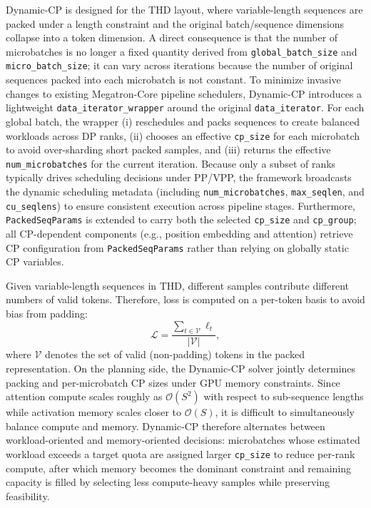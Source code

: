 \documentclass[10pt,logo,copyright]{nvidiatechreport}
\begin{document}
Dynamic-CP is designed for the THD layout, where variable-length sequences are packed under a length constraint and the original batch/sequence dimensions collapse into a token dimension. A direct consequence is that the number of microbatches is no longer a fixed quantity derived from \texttt{global\_batch\_size} and \texttt{micro\_batch\_size}; it can vary across iterations because the number of original sequences packed into each microbatch is not constant. To minimize invasive changes to existing Megatron-Core pipeline schedulers, Dynamic-CP introduces a lightweight \texttt{data\_iterator\_wrapper} around the original \texttt{data\_iterator}. For each global batch, the wrapper (i) reschedules and packs sequences to create balanced workloads across DP ranks, (ii) chooses an effective \texttt{cp\_size} for each microbatch to avoid over-sharding short packed samples, and (iii) returns the effective \texttt{num\_microbatches} for the current iteration. Because only a subset of ranks typically drives scheduling decisions under PP/VPP, the framework broadcasts the dynamic scheduling metadata (including \texttt{num\_microbatches}, \texttt{max\_seqlen}, and \texttt{cu\_seqlens}) to ensure consistent execution across pipeline stages. Furthermore, \texttt{PackedSeqParams} is extended to carry both the selected \texttt{cp\_size} and \texttt{cp\_group}; all CP-dependent components (e.g., position embedding and attention) retrieve CP configuration from \texttt{PackedSeqParams} rather than relying on globally static CP variables.

Given variable-length sequences in THD, different samples contribute different numbers of valid tokens. Therefore, loss is computed on a per-token basis to avoid bias from padding:
\begin{equation}
\mathcal{L} = \frac{\sum_{t\in \mathcal{V}} \ell_t}{|\mathcal{V}|},
\end{equation}
where $\mathcal{V}$ denotes the set of valid (non-padding) tokens in the packed representation. On the planning side, the Dynamic-CP solver jointly determines packing and per-microbatch CP sizes under GPU memory constraints. Since attention compute scales roughly as $\mathcal{O}(S^2)$ with respect to sub-sequence lengths while activation memory scales closer to $\mathcal{O}(S)$, it is difficult to simultaneously balance compute and memory. Dynamic-CP therefore alternates between workload-oriented and memory-oriented decisions: microbatches whose estimated workload exceeds a target quota are assigned larger \texttt{cp\_size} to reduce per-rank compute, after which memory becomes the dominant constraint and remaining capacity is filled by selecting less compute-heavy samples while preserving feasibility.
\end{document}
